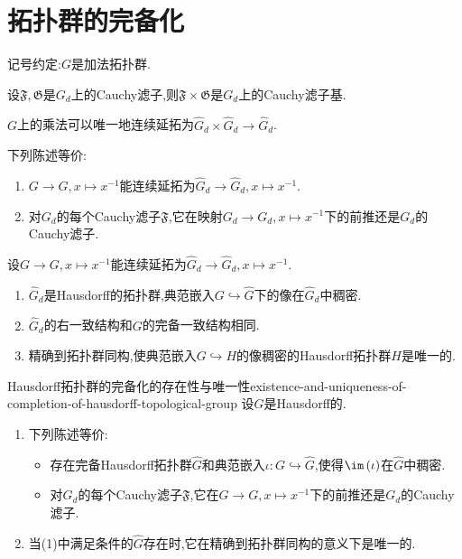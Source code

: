 \section{拓扑群的完备化}

记号约定:$G$是加法拓扑群.

\begin{proposition}{}{}
	设$\mathfrak{F},\mathfrak{G}$是$G_{d}$上的Cauchy滤子,则$\mathfrak{F}\times\mathfrak{G}$是$G_{d}$上的Cauchy滤子基.
\end{proposition}

\begin{corollary}{}{}
	$G$上的乘法可以唯一地连续延拓为$\hat{G}_{d}\times\hat{G}_{d}\to\hat{G}_{d}$.
\end{corollary}

\begin{proposition}{}{}
	下列陈述等价:
	\begin{enumerate}
		\item $G\to G,x\mapsto x^{-1}$能连续延拓为$\hat{G}_{d}\to\hat{G}_{d},x\mapsto x^{-1}$.
		\item 对$G_{d}$的每个Cauchy滤子$\mathfrak{F}$,它在映射$G_{d}\to G_{d},x\mapsto x^{-1}$下的前推还是$G_{d}$的Cauchy滤子.
	\end{enumerate}
\end{proposition}

\begin{theorem}{}{}
	设$G\to G,x\mapsto x^{-1}$能连续延拓为$\hat{G}_{d}\to\hat{G}_{d},x\mapsto x^{-1}$.
	\begin{enumerate}
		\item $\hat{G}_{d}$是Hausdorff的拓扑群,典范嵌入$G\hookrightarrow\hat{G}$下的像在$\hat{G}_{d}$中稠密.
		\item $\hat{G}_{d}$的右一致结构和$G$的完备一致结构相同.
		\item 精确到拓扑群同构,使典范嵌入$G\hookrightarrow H$的像稠密的Hausdorff拓扑群$H$是唯一的.
	\end{enumerate}
\end{theorem}

\begin{theorem}{Hausdorff拓扑群的完备化的存在性与唯一性}{existence-and-uniqueness-of-completion-of-hausdorff-topological-group}
	设$G$是Hausdorff的.
	\begin{enumerate}
		\item 下列陈述等价:
		\begin{itemize}
			\item 存在完备Hausdorff拓扑群$\hat{G}$和典范嵌入$\iota:G\hookrightarrow\hat{G}$,使得$\im\left(\iota\right)$在$\hat{G}$中稠密.
			\item 对$G_{d}$的每个Cauchy滤子$\mathfrak{F}$,它在$G\to G,x\mapsto x^{-1}$下的前推还是$G_{d}$的Cauchy滤子.
		\end{itemize}
		\item 当(1)中满足条件的$\hat{G}$存在时,它在精确到拓扑群同构的意义下是唯一的.
	\end{enumerate}
\end{theorem}

